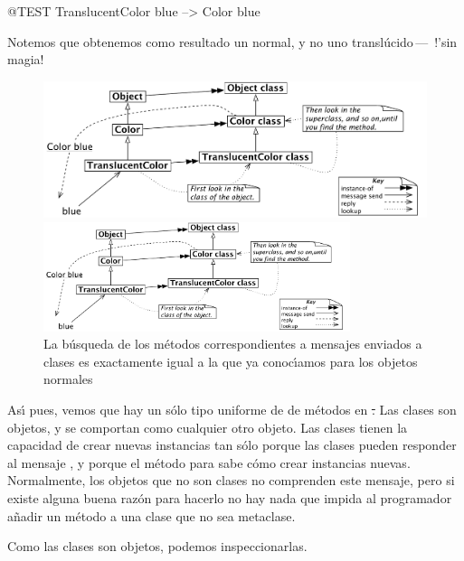 \documentclass[a4paper,10pt,twoside]{book}
\begin{document}
\begin{code}{@TEST}
TranslucentColor blue --> Color blue
\end{code}
\noindent
Notemos que obtenemos como resultado un  normal, y no uno transl\'ucido\,---\, !'sin magia!

\begin{center}
\begin{figure}[!ht]
\ifluluelse
	{\centerline {\includegraphics[width=\textwidth]{TranslucentColorBlue}}}
	{\centerline {\includegraphics[width=0.8\textwidth]{TranslucentColorBlue}}}
\caption{La b\'usqueda de los m\'etodos correspondientes a mensajes enviados a clases es exactamente igual a la que ya conoc\'{\i}amos para los objetos normales}
\end{figure}
\end{center}

As\'{\i} pues, vemos que hay un s\'olo tipo uniforme de  de m\'etodos en \st. Las clases son objetos, y se comportan como cualquier otro objeto. Las clases tienen la capacidad de crear nuevas instancias tan s\'olo porque las clases pueden responder al mensaje , y porque el m\'etodo para  sabe c\'omo crear instancias nuevas. Normalmente, los objetos que no son clases no comprenden este mensaje, pero si existe alguna buena raz\'on para hacerlo no hay nada que impida al programador a\~nadir un m\'etodo  a una clase que no sea metaclase.

Como las clases son objetos, podemos inspeccionarlas.

\end{document}
